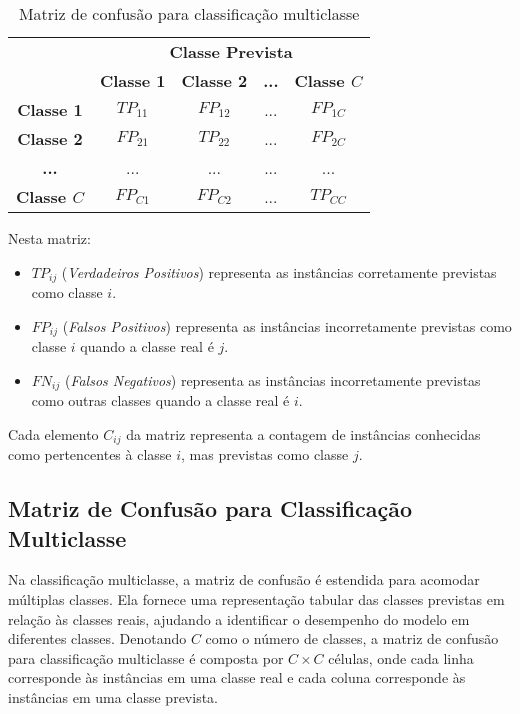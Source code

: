 \begin{table}[h]
\centering
\caption{Matriz de confusão para classificação multiclasse}
\label{tab:confusion_matrix_multiclass}
\begin{tabular}{c|c|c|c|c}
\multicolumn{1}{c}{} & \multicolumn{4}{c}{\textbf{Classe Prevista}} \\ \cline{2-5} 
\multicolumn{1}{c|}{} & \textbf{Classe 1} & \textbf{Classe 2} & \textbf{...} & \textbf{Classe \(C\)} \\ \hline
 \rowcolor{red!25}  \textbf{Classe 1} & \cellcolor{green!25} \(TP_{11}\) & \(FP_{12}\) & ... & \(FP_{1C}\) \\ \hline
\rowcolor{red!25} \textbf{Classe 2} & \(FP_{21}\) & \cellcolor{green!25} \(TP_{22}\) & ... & \(FP_{2C}\) \\ \hline
\rowcolor{red!25} \textbf{...} & ... & ... & \cellcolor{green!25} ... & ... \\ \hline
\rowcolor{red!25} \textbf{Classe \(C\)} & \(FP_{C1}\) & \(FP_{C2}\) & ... & \cellcolor{green!25} \(TP_{CC}\) \\ \hline
\end{tabular}
\end{table}

Nesta matriz:
\begin{itemize}
    \item \(TP_{ij}\) (\textit{Verdadeiros Positivos}) representa as instâncias corretamente previstas como classe \(i\).
    \item \(FP_{ij}\) (\textit{Falsos Positivos}) representa as instâncias incorretamente previstas como classe \(i\) quando a classe real é \(j\).
    \item \(FN_{ij}\) (\textit{Falsos Negativos}) representa as instâncias incorretamente previstas como outras classes quando a classe real é \(i\).
\end{itemize}

Cada elemento \(C_{ij}\) da matriz representa a contagem de instâncias conhecidas como pertencentes à classe \(i\), mas previstas como classe \(j\).

\subsection{Matriz de Confusão para Classificação Multiclasse}

Na classificação multiclasse, a matriz de confusão é estendida para acomodar múltiplas classes. Ela fornece uma representação tabular das classes previstas em relação às classes reais, ajudando a identificar o desempenho do modelo em diferentes classes. Denotando \(C\) como o número de classes, a matriz de confusão para classificação multiclasse é composta por \(C \times C\) células, onde cada linha corresponde às instâncias em uma classe real e cada coluna corresponde às instâncias em uma classe prevista.

